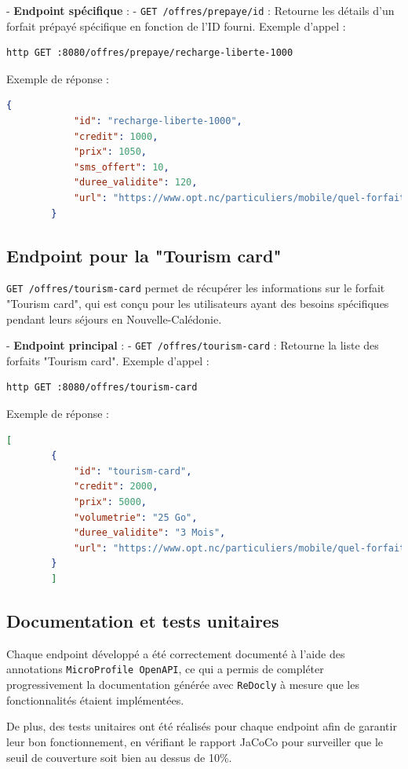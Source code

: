 \documentclass{article}
\begin{document}
	- \textbf{Endpoint spécifique} :
	- \texttt{GET /offres/prepaye/{id}} : Retourne les détails d'un forfait prépayé spécifique en fonction de l'ID fourni.
	Exemple d'appel :
	\begin{lstlisting}[language=bash]
		http GET :8080/offres/prepaye/recharge-liberte-1000
	\end{lstlisting}
	Exemple de réponse :
	\begin{lstlisting}[language=JSON]
		{
			"id": "recharge-liberte-1000",
			"credit": 1000,
			"prix": 1050,
			"sms_offert": 10,
			"duree_validite": 120,
			"url": "https://www.opt.nc/particuliers/mobile/quel-forfait-choisir/kit-prepaye-liberte"
		}
	\end{lstlisting}
	
	\subsection{Endpoint pour la "Tourism card"}
	\texttt{GET /offres/tourism-card} permet de récupérer les informations sur le forfait "Tourism card", qui est conçu pour les utilisateurs ayant des besoins spécifiques pendant leurs séjours en Nouvelle-Calédonie.
	
	- \textbf{Endpoint principal} :
	- \texttt{GET /offres/tourism-card} : Retourne la liste des forfaits "Tourism card".
	Exemple d'appel :
	\begin{lstlisting}[language=bash]
		http GET :8080/offres/tourism-card
	\end{lstlisting}
	Exemple de réponse :
	\begin{lstlisting}[language=JSON]
		[
		{
			"id": "tourism-card",
			"credit": 2000,
			"prix": 5000,
			"volumetrie": "25 Go",
			"duree_validite": "3 Mois",
			"url": "https://www.opt.nc/particuliers/mobile/quel-forfait-choisir/tourism-card-1000"
		}
		]
	\end{lstlisting}
	\subsection{Documentation et tests unitaires}
	
	Chaque endpoint développé a été correctement documenté à l'aide des annotations \texttt{MicroProfile OpenAPI}, ce qui a permis de compléter progressivement la documentation générée avec \texttt{ReDocly} à mesure que les fonctionnalités étaient implémentées.
	
	De plus, des tests unitaires ont été réalisés pour chaque endpoint afin de garantir leur bon fonctionnement, en vérifiant le rapport JaCoCo pour surveiller que le seuil de couverture soit bien au dessus de 10\%.
	\newpage
	
\end{document}
